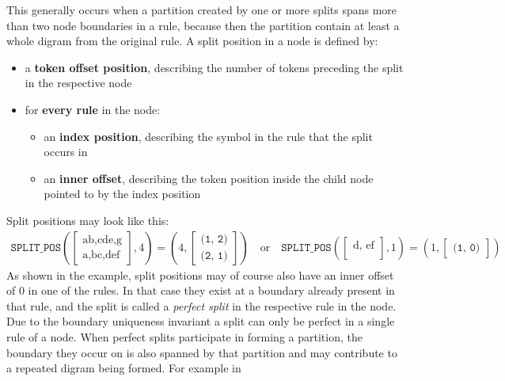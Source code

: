\noindent This generally occurs when a partition created by one or more splits spans more than two node boundaries in a rule, because then the partition contain at least a whole digram from the original rule.
\bigbreak%
\noindent
A split position in a node is defined by:
%
\begin{itemize}[topsep=0pt]
    \setlength\parskip{0em}
    \setlength\itemsep{0em}
    \item a \textbf{token offset position}, describing the number of tokens preceding the split in the respective node
    \item for \textbf{every rule} in the node:
    \begin{itemize}
        \item an \textbf{index position}, describing the symbol in the rule that the split occurs in
        \item an \textbf{inner offset}, describing the token position inside the child node pointed to by the index position
    \end{itemize}
\end{itemize}
%
Split positions may look like this:
\begin{align*}
    \texttt{SPLIT\_POS}\left(
    \begin{bmatrix}
        \text{ab,cde,g}\\
        \text{a,bc,def}
    \end{bmatrix},
    4
    \right) = \left(
    4,
    \begin{bmatrix}
        \texttt{(1, 2)}\\
        \texttt{(2, 1)}
    \end{bmatrix}
    \right)
    \quad
    \textrm{or}
    \quad
    \texttt{SPLIT\_POS}\left(
    \begin{bmatrix}
        \text{d, ef}\\
    \end{bmatrix},
    1
    \right) = \left(
    1,
    \begin{bmatrix}
        \texttt{(1, 0)}
    \end{bmatrix}
\right)
\end{align*}
As shown in the example, split positions may of course also have an inner offset of $0$ in one of the rules. In that case they exist at a boundary already present in that rule, and the split is called a \textit{perfect split} in the respective rule in the node. Due to the boundary uniqueness invariant a split can only be perfect in a single rule of a node.
\noindent
When perfect splits participate in forming a partition, the boundary they occur on is also spanned by that partition and may contribute to a repeated digram being formed. For example in
